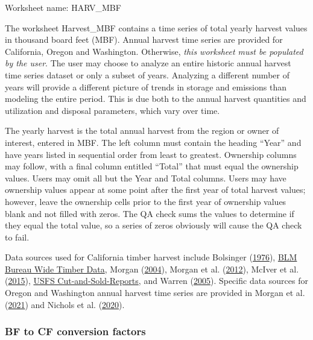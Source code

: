 \documentclass[
  openany]{book}
\begin{document}
Worksheet name: HARV\_MBF

The worksheet Harvest\_MBF contains a time series of total yearly
harvest values in thousand board feet (MBF). Annual harvest time series
are provided for California, Oregon and Washington. Otherwise,
\emph{this worksheet must be populated by the user}. The user may choose
to analyze an entire historic annual harvest time series dataset or only
a subset of years. Analyzing a different number of years will provide a
different picture of trends in storage and emissions than modeling the
entire period. This is due both to the annual harvest quantities and
utilization and disposal parameters, which vary over time.

The yearly harvest is the total annual harvest from the region or owner
of interest, entered in MBF. The left column must contain the heading
``Year'' and have years listed in sequential order from least to
greatest. Ownership columns may follow, with a final column entitled
``Total'' that must equal the ownership values. Users may omit all but
the Year and Total columns. Users may have ownership values appear at
some point after the first year of total harvest values; however, leave
the ownership cells prior to the first year of ownership values blank
and not filled with zeros. The QA check sums the values to determine if
they equal the total value, so a series of zeros obviously will cause
the QA check to fail.

Data sources used for California timber harvest include Bolsinger
(\protect\hyperlink{ref-bolsinger1976}{1976}),
\href{https://www.blm.gov/programs/natural-resources/forests-and-woodlands/timber-sales/bureau-wide-timber-data}{BLM
Bureau Wide Timber Data}, Morgan
(\protect\hyperlink{ref-morgan2004}{2004}), Morgan et al.
(\protect\hyperlink{ref-morgan2012}{2012}), McIver et al.
(\protect\hyperlink{ref-mciver2015}{2015}),
\href{https://www.fs.fed.us/forestmanagement/products/cut-sold/index.shtml}{USFS
Cut-and-Sold-Reports}, and Warren
(\protect\hyperlink{ref-warren2005}{2005}). Specific data sources for
Oregon and Washington annual harvest time series are provided in Morgan
et al. (\protect\hyperlink{ref-morgan2021}{2021}) and Nichols et al.
(\protect\hyperlink{ref-nichols2020}{2020}).

\hypertarget{own-prov-input-bfcf}{%
\subsubsection{BF to CF conversion factors}\label{own-prov-input-bfcf}}
\end{document}
